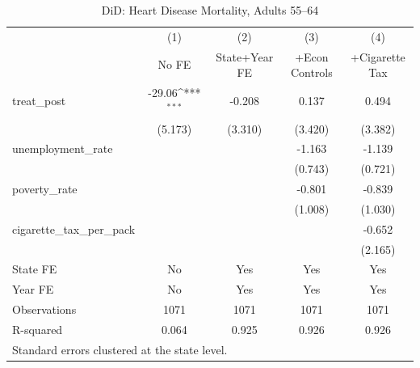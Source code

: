 \begin{table}[htbp]\centering
\def\sym#1{\ifmmode^{#1}\else\(^{#1}\)\fi}
\caption{DiD: Heart Disease Mortality, Adults 55--64}
\begin{tabular}{l*{4}{c}}
\toprule
                    &\multicolumn{1}{c}{(1)}&\multicolumn{1}{c}{(2)}&\multicolumn{1}{c}{(3)}&\multicolumn{1}{c}{(4)}\\
                    &\multicolumn{1}{c}{No FE}&\multicolumn{1}{c}{State+Year FE}&\multicolumn{1}{c}{+Econ Controls}&\multicolumn{1}{c}{+Cigarette Tax}\\
\midrule
treat\_post          &      -29.06\sym{***}&      -0.208         &       0.137         &       0.494         \\
                    &     (5.173)         &     (3.310)         &     (3.420)         &     (3.382)         \\
\addlinespace
unemployment\_rate   &                     &                     &      -1.163         &      -1.139         \\
                    &                     &                     &     (0.743)         &     (0.721)         \\
\addlinespace
poverty\_rate        &                     &                     &      -0.801         &      -0.839         \\
                    &                     &                     &     (1.008)         &     (1.030)         \\
\addlinespace
cigarette\_tax\_per\_pack&                     &                     &                     &      -0.652         \\
                    &                     &                     &                     &     (2.165)         \\
\midrule
State FE            &          No         &         Yes         &         Yes         &         Yes         \\
Year FE             &          No         &         Yes         &         Yes         &         Yes         \\
Observations        &        1071         &        1071         &        1071         &        1071         \\
R-squared           &       0.064         &       0.925         &       0.926         &       0.926         \\
\bottomrule
\multicolumn{5}{l}{\footnotesize Standard errors clustered at the state level.}\\
\end{tabular}
\end{table}
